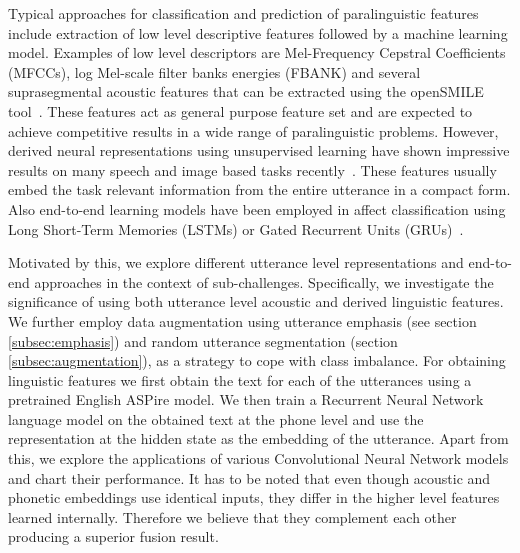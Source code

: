 \begin{comment}
Par3: What are the baseline models provided? what do they use?
The features used in the baselines presented by the organizers of the ComParE Challenge 2018 are composed by a standard set of segmental, suprasegmental features and also utterance level acoustic representations. 
\end{comment}
Typical approaches for classification and prediction of paralinguistic features include extraction of low level descriptive features followed by a machine learning model. Examples of low level descriptors are Mel-Frequency Cepstral Coefficients (MFCCs), log Mel-scale filter banks energies (FBANK) and several suprasegmental acoustic features that can be extracted using the openSMILE tool~\cite{opensmile2010}. These features act as general purpose feature set and are expected to achieve competitive results in a wide range of paralinguistic problems.  However, derived neural representations using unsupervised learning have shown impressive results on many speech and image based tasks recently~\cite{aytar2016soundnet}. These features usually embed the task relevant information from the entire utterance in a compact form. Also end-to-end learning models have been employed in affect classification using Long Short-Term Memories (LSTMs) or Gated Recurrent Units (GRUs)~\cite{trigeorgis2016adieu,Interspeech2018}. 


Motivated by this, we explore different utterance level representations and end-to-end approaches in the context of sub-challenges. Specifically, we investigate the significance of using both utterance level acoustic and derived linguistic features. We further employ data augmentation using utterance emphasis (see section \ref{subsec:emphasis}) and random utterance segmentation (section \ref{subsec:augmentation}), as a strategy to cope with class imbalance. For obtaining linguistic features we first obtain the text for each of the utterances using a pretrained English ASPire model. We then train a Recurrent Neural Network language model on the obtained text at the phone level and use the representation at the hidden state as the embedding of the utterance. Apart from this, we explore the applications of various Convolutional Neural Network models and chart their performance. It has to be noted that even though acoustic and phonetic embeddings use identical  inputs, they differ in the higher level features learned internally. Therefore we believe that they complement each other producing a superior fusion result. 


